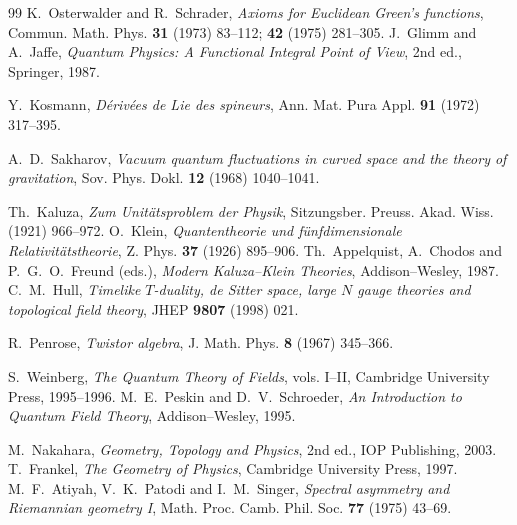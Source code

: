 \documentclass[11pt,oneside]{book}
\theoremstyle{plain}
\theoremstyle{definition}
\theoremstyle{remark}
\begin{document}
\begin{thebibliography}{99}
 K.~Osterwalder and R.~Schrader, \emph{Axioms for
Euclidean Green's functions}, Commun. Math. Phys. \textbf{31} (1973) 83--112;
\textbf{42} (1975) 281--305.
 J.~Glimm and A.~Jaffe, \emph{Quantum Physics: A Functional
Integral Point of View}, 2nd ed., Springer, 1987.

 Y.~Kosmann, \emph{D\'eriv\'ees de Lie des spineurs}, Ann.
Mat. Pura Appl. \textbf{91} (1972) 317--395.

 A.~D.~Sakharov, \emph{Vacuum quantum fluctuations in curved
space and the theory of gravitation}, Sov. Phys. Dokl. \textbf{12} (1968)
1040--1041.

 Th.~Kaluza, \emph{Zum Unit\"atsproblem der Physik},
Sitzungsber. Preuss. Akad. Wiss. (1921) 966--972.
 O.~Klein, \emph{Quantentheorie und f\"unfdimensionale
Relativit\"atstheorie}, Z. Phys. \textbf{37} (1926) 895--906.
 Th.~Appelquist, A.~Chodos and P.~G.~O.~Freund (eds.),
\emph{Modern Kaluza--Klein Theories}, Addison--Wesley, 1987.
 C.~M.~Hull, \emph{Timelike $T$-duality, de Sitter space, large
$N$ gauge theories and topological field theory}, JHEP \textbf{9807} (1998) 021.

 R.~Penrose, \emph{Twistor algebra}, J. Math. Phys.
\textbf{8} (1967) 345--366.

 S.~Weinberg, \emph{The Quantum Theory of Fields},
vols. I--II, Cambridge University Press, 1995--1996.
 M.~E.~Peskin and D.~V.~Schroeder, \emph{An
Introduction to Quantum Field Theory}, Addison--Wesley, 1995.

 M.~Nakahara, \emph{Geometry, Topology and Physics}, 2nd
ed., IOP Publishing, 2003.
 T.~Frankel, \emph{The Geometry of Physics}, Cambridge
University Press, 1997.
 M.~F.~Atiyah, V.~K.~Patodi and I.~M.~Singer,
\emph{Spectral asymmetry and Riemannian geometry I}, Math. Proc. Camb. Phil. Soc.
\textbf{77} (1975) 43--69.

\end{thebibliography}
\end{document}
